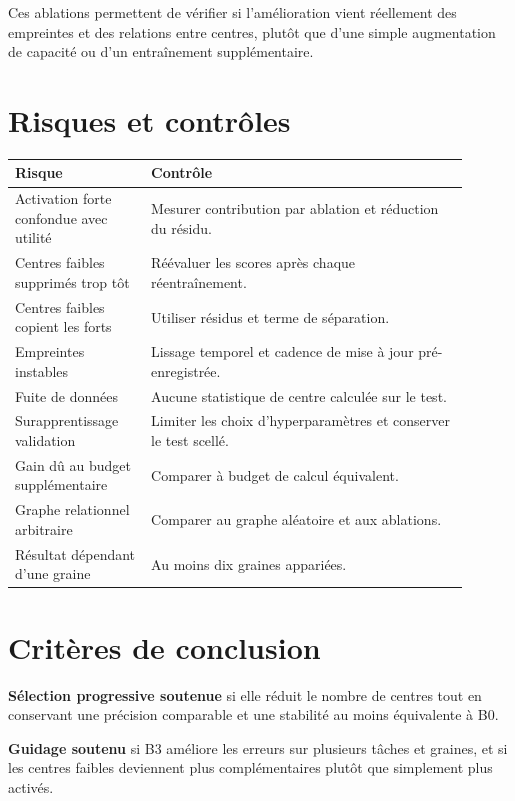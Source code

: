 \documentclass[11pt,a4paper]{article}
\begin{document}
Ces ablations permettent de vérifier si l'amélioration vient réellement
des empreintes et des relations entre centres, plutôt que d'une simple
augmentation de capacité ou d'un entraînement supplémentaire.

\section{Risques et contrôles}

\begin{longtable}{p{0.27\linewidth}p{0.63\linewidth}}
\toprule
\textbf{Risque} & \textbf{Contrôle} \\
\midrule
Activation forte confondue avec utilité &
Mesurer contribution par ablation et réduction du résidu. \\
Centres faibles supprimés trop tôt &
Réévaluer les scores après chaque réentraînement. \\
Centres faibles copient les forts &
Utiliser résidus et terme de séparation. \\
Empreintes instables &
Lissage temporel et cadence de mise à jour pré-enregistrée. \\
Fuite de données &
Aucune statistique de centre calculée sur le test. \\
Surapprentissage validation &
Limiter les choix d'hyperparamètres et conserver le test scellé. \\
Gain dû au budget supplémentaire &
Comparer à budget de calcul équivalent. \\
Graphe relationnel arbitraire &
Comparer au graphe aléatoire et aux ablations. \\
Résultat dépendant d'une graine &
Au moins dix graines appariées. \\
\bottomrule
\end{longtable}

\section{Critères de conclusion}

\textbf{Sélection progressive soutenue} si elle réduit le nombre de
centres tout en conservant une précision comparable et une stabilité
au moins équivalente à B0.

\textbf{Guidage soutenu} si B3 améliore les erreurs sur plusieurs tâches
et graines, et si les centres faibles deviennent plus complémentaires
plutôt que simplement plus activés.
\end{document}
